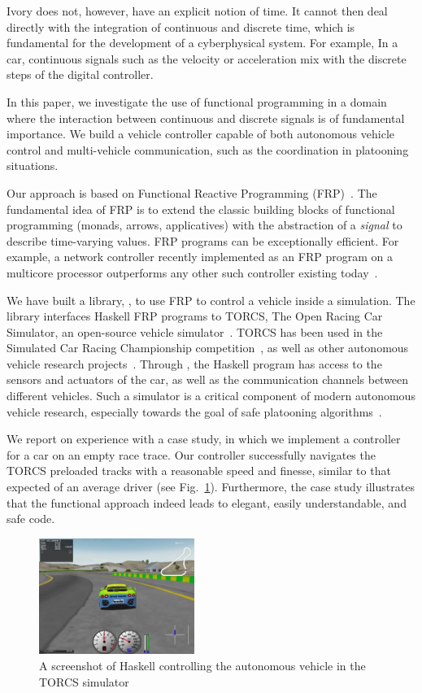 Ivory does not, however, have an explicit notion of time.
It cannot then deal directly with the integration of 
continuous and discrete time, which is fundamental for the
development of a cyberphysical system. For example,
In a car, continuous signals such as the velocity or acceleration
mix with the discrete steps of the digital controller.

In this paper, we investigate the use of functional programming
in a domain where the interaction between continuous and discrete signals
is of fundamental importance. We build a vehicle controller capable
of both autonomous vehicle control and multi-vehicle communication,
such as the coordination in platooning situations.

Our approach is based on Functional Reactive Programming
(FRP)~\cite{hudak2003arrows,hudak2000haskell}.
The fundamental idea of FRP is to extend the classic building blocks 
of functional programming (\eg monads, arrows,
applicatives)
with the abstraction of a \emph{signal} to
describe time-varying values. FRP programs can be exceptionally
efficient.  For example, a network controller recently implemented as
an FRP program on a multicore processor outperforms any other such
controller existing today~\cite{Voellmy:2012:SSD:2377677.2377735}.

We have built a library, \ourLib, to use FRP to control a vehicle inside a simulation.
The library interfaces Haskell FRP programs to TORCS, The Open Racing Car Simulator, an open-source vehicle simulator~\cite{torcs}.
TORCS has been used in the Simulated Car Racing Championship competition~\cite{SCRC}, as well as other autonomous vehicle research projects~\cite{xu2016experimental,OnievaPAMP09,conf/cig/CardamoneLL09,conf/cig/MunozGS10}. 
Through \ourLib, the Haskell program has access to the sensors and actuators of the car, as well
as the communication channels between different vehicles.
Such a simulator is a  critical component of modern autonomous vehicle research, especially towards the goal of safe platooning algorithms~\cite{?}.

We report on experience with a case study, in which we implement a controller for a car on an empty race trace. 
Our controller successfully navigates the TORCS preloaded tracks with a reasonable speed and finesse, similar to that expected of an average driver (see Fig.~\ref{fig:race}). 
Furthermore, the case study illustrates that the functional approach indeed leads to elegant, easily understandable, and safe code.

\begin{figure}[t]
\includegraphics[width=0.45\textwidth]{figs/racing.png}
\caption{A screenshot of Haskell controlling the autonomous vehicle in the TORCS simulator}
\label{fig:race}
\end{figure}
